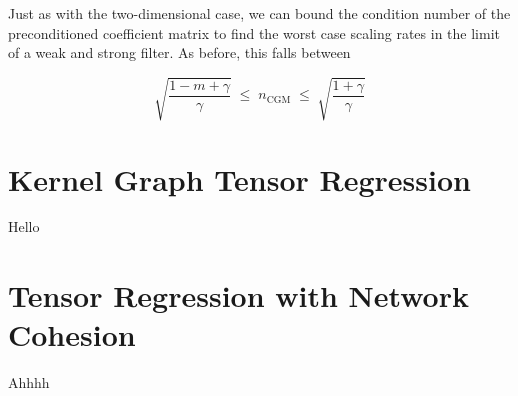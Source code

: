 \begin{algorithm}[t]
\begin{algorithmic}
        \vspace{0.15cm}
        \vspace{0.15cm}
        \State{$\Zt \leftarrow  \Zt + \alpha \Dt $}
        \vspace{0.15cm}
        \State{$\Rt \leftarrow  \Rt - \alpha \At $}
        \vspace{0.15cm}
        \vspace{0.15cm}
        \State{$\Dt \leftarrow  \Rt + \delta \Dt $}
        \vspace{0.25cm}
        \EndWhile
        \vspace{0.5cm}
        \vspace{0.15cm}
    \end{algorithmic}
    \label{al:CGM_dd}
\end{algorithm}



Just as with the two-dimensional case, we can bound the condition number of the preconditioned coefficient matrix to find the worst case scaling rates in the limit of a weak and strong filter. As before, this falls between

$$
\sqrt{\frac{1 - m + \gamma}{\gamma}} \; \leq \; n_{\text{CGM}} \; \leq \; \sqrt{\frac{1+\gamma}{\gamma}}
$$

\section{Kernel Graph Tensor Regression}

Hello

\section{Tensor Regression with Network Cohesion}

Ahhhh

